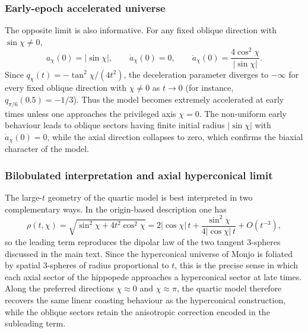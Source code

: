 \documentclass[preprint,12pt]{elsarticle}
\begin{document}
\subsubsection*{Early-epoch accelerated universe}



The opposite limit is also informative. For any fixed oblique direction with $\sin\chi\neq0$,
\begin{equation}
a_\chi(0)=|\sin\chi|,\qquad \dot a_\chi(0)=0,\qquad \ddot a_\chi(0)=\frac{4\cos^2\chi}{|\sin\chi|}.
\end{equation}
Since $q_\chi(t)=-\tan^2\chi/(4t^2)$, the deceleration parameter diverges to $-\infty$ for every fixed oblique direction with $\chi\neq0$ as $t\to0$ (for instance, $q_{\pi/6}(0.5)=-1/3$). Thus the model becomes extremely accelerated at early times unless one approaches the privileged axis $\chi=0$. The non-uniform early behaviour leads to oblique sectors having finite initial radius $|\sin\chi|$ with $\dot a_\chi(0)=0$, while the axial direction collapses to zero, which confirms the biaxial character of the model.


\subsubsection*{Bilobulated interpretation and axial hyperconical limit}

The large-$t$ geometry of the quartic model is best interpreted in two complementary ways. In the origin-based description one has
\begin{equation}
\rho(t,\chi)=\sqrt{\sin^2\chi+4t^2\cos^2\chi}
=2|{\cos\chi}|\,t+\frac{\sin^2\chi}{4|{\cos\chi}|\,t}+O(t^{-3}),
\end{equation}
so the leading term reproduces the dipolar law of the two tangent $3$-spheres discussed in the main text. Since the hyperconical universe of Monjo is foliated by spatial $3$-spheres of radius proportional to $t$, this is the precise sense in which each axial sector of the hippopede approaches a hyperconical sector at late times. Along the preferred directions $\chi\approx0$ and $\chi\approx\pi$, the quartic model therefore recovers the same linear coasting behaviour as the hyperconical construction, while the oblique sectors retain the anisotropic correction encoded in the subleading term.
\end{document}

